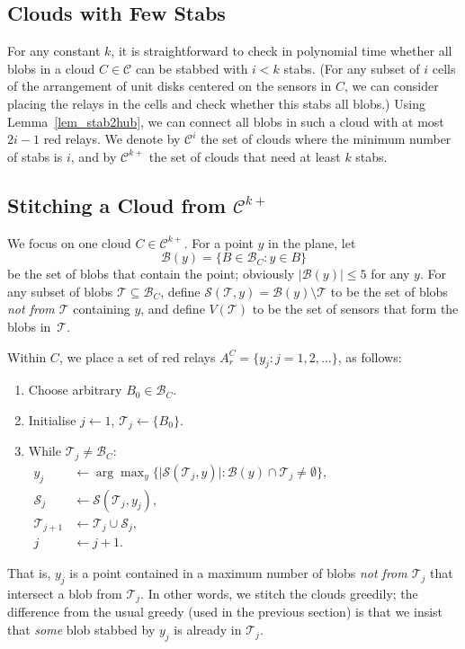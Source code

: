 \documentclass[11pt,a4paper]{article}
\newcommand{\s}[1]{{\lvert #1 \rvert}}
\newcommand{\myB}{\mathcal{B}} \newcommand{\myC}{\mathcal{C}} \newcommand{\myD}{\mathcal{D}} \newcommand{\myP}{\mathcal{P}} \newcommand{\myS}{\mathcal{S}}
\newcommand{\myT}{\mathcal{T}}
\theoremstyle{definition}
\theoremstyle{remark}
\begin{document}
\subsection{Clouds with Few Stabs}

For any constant $k$, it is straightforward to check in polynomial time whether all blobs in a cloud $C\in\myC$ can be stabbed with $i<k$ stabs. (For any subset of $i$ cells of the arrangement of unit disks centered on the sensors in $C$, we can consider placing the relays in the cells and check whether this stabs all blobs.)  Using Lemma~\ref{lem_stab2hub}, we can connect all blobs in such a cloud with at most $2i-1$ red relays. We denote by $\myC^{i}$ the set of clouds where the minimum number of stabs is $i$, and by $\myC^{k+}$ the set of clouds that need at least $k$ stabs.

\subsection{Stitching a Cloud from \texorpdfstring{$\myC^{k+}$}{Ck+}}

We focus on one cloud $C \in \myC^{k+}$. For a point $y$ in the plane, let
\[
    \myB(y) = \{ B \in \myB_C : y \in B \}
\]
be the set of blobs that contain the point; obviously $\s{\myB(y)} \le 5$ for any $y$. For any subset of blobs $\myT \subseteq \myB_C$, define $ \myS(\myT,y) = \myB(y) \setminus \myT$ to be the set of blobs \emph{not from $\myT$} containing $y$, and define $V(\myT)$ to be the set of sensors that form the blobs in~$\myT$.

Within $C$, we place a set of red relays $A_r^C = \{ y_j : j = 1, 2, \dotsc \}$, as follows:
\begin{enumerate}
    \item Choose arbitrary $B_0 \in \myB_C$.
    \item Initialise $j \gets 1$, $\myT_j \gets \{ B_0 \}$.
    \item While $\myT_j \ne \myB_C$:
        \\[1ex]\hspace*{1em}$\begin{aligned}
            y_j &\gets \arg \textstyle\max_{y} \{ \s{\myS(\myT_j,y)} : \myB(y) \cap \myT_j \ne \emptyset \}, \\
            \myS_j &\gets \myS(\myT_j,y_j), \\
            \myT_{j+1} &\gets \myT_j \cup \myS_j, \\
            j &\gets j + 1.
        \end{aligned}$
\end{enumerate}
That is, $y_j$ is a point contained in a maximum number of blobs \emph{not from $\myT_j$} that intersect a blob from $\myT_j$. In other words, we stitch the clouds greedily; the difference from the usual greedy (used in the previous section) is that we insist that {\em some} blob stabbed by $y_j$ is already in $\myT_j$.
\end{document}
